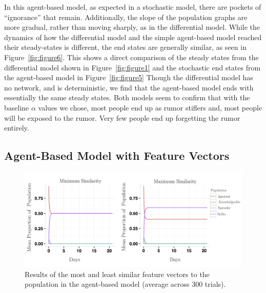 In this agent-based model, as expected in a stochastic model, there are pockets of ``ignorance'' that remain.
Additionally, the slope of the population graphs are more gradual, rather than moving sharply, as in the differential model.
While the dynamics of how the differential model and the simple agent-based model reached their steady-states is  different, the end states are generally similar, as seen in Figure~\ref{fig:figure6}.
This shows a direct comparison of the steady states from the differential model shown in Figure~\ref{fig:figure1} and the stochastic end states from the agent-based model in Figure~\ref{fig:figure5}  Though the differential model has no network, and is deterministic, we find that the agent-based model ends with essentially the same steady states.
Both models seem to confirm that with the baseline $\alpha$ values we chose, most people end up as rumor stiflers and, most people will be exposed to the rumor.
Very few people end up forgetting the rumor entirely.

\subsection{Agent-Based Model with Feature Vectors}
\label{subsec:featvect}

\begin{figure}[H]
\captionsetup{width=0.8\textwidth}
\centering
    \includegraphics[width=1\textwidth]{figures/figure7}
  \caption{ Results of the most and least similar feature vectors to the population in the agent-based model (average across $ 300 $ trials).}
\label{fig:figure7}
\end{figure}

